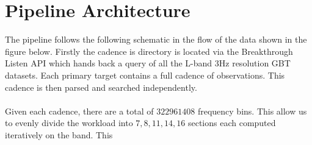 \documentclass{article}
\begin{document}
\section*{Pipeline Architecture}
The pipeline follows the following schematic in the flow of the data shown in the figure below. Firstly the cadence is directory is located via the Breakthrough Listen API which hands back a query of all the L-band 3Hz resolution GBT datasets. Each primary target contains a full cadence of observations. This cadence is then parsed and searched independently. \\
\\
Given each cadence, there are a total of $322961408$ frequency bins. This allow us to evenly divide the workload into \(7,8,11,14,16\) sections each computed iteratively on the band. This 
\end{document}
